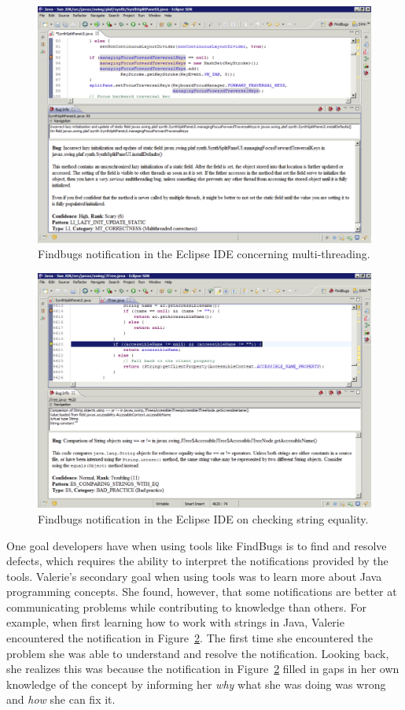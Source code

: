 \documentclass{llncs}
\begin{document}
\begin{figure} [ht]
	\centering
	\includegraphics[width=\textwidth]{figs/eclipse.png}
	\caption{Findbugs notification in the Eclipse IDE concerning multi-threading.}
	\label{fig:eclipse}
\end{figure} 

\begin{figure} 
	\centering
	\includegraphics[width=\textwidth]{figs/eclipse-2.png}
	\caption{Findbugs notification in the Eclipse IDE on checking string equality.}
	\label{fig:eclipse2}
\end{figure}

One goal developers have when using tools like FindBugs is to find and resolve defects, which requires the ability to interpret the notifications provided by the tools. Valerie's secondary goal when using tools was to learn more about Java programming concepts. She found, however, that some notifications are better at communicating problems while contributing to knowledge than others. For example, when first learning how to work with strings in Java, Valerie encountered the notification in Figure~\ref{fig:eclipse2}. The first time she encountered the problem she was able to understand and resolve the notification. Looking back, she realizes this was because the notification in Figure~\ref{fig:eclipse2} filled in gaps in her own knowledge of the concept by informing her \emph{why} what she was doing was wrong and \emph{how} she can fix it.
\end{document}
